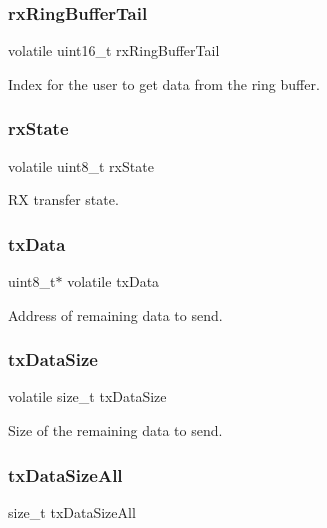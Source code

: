 \subsubsection{\texorpdfstring{rxRingBufferTail}{rxRingBufferTail}}
{\footnotesize\ttfamily volatile uint16\+\_\+t rx\+Ring\+Buffer\+Tail}

Index for the user to get data from the ring buffer. \mbox{\label{struct__lpuart__handle_a6f289c8f3bd5e967fb808de6da7f1c0c}} 
\subsubsection{\texorpdfstring{rxState}{rxState}}
{\footnotesize\ttfamily volatile uint8\+\_\+t rx\+State}

RX transfer state. \mbox{\label{struct__lpuart__handle_ab56d8f300582ce9d7f4a79729124739d}} 
\subsubsection{\texorpdfstring{txData}{txData}}
{\footnotesize\ttfamily uint8\+\_\+t$\ast$ volatile tx\+Data}

Address of remaining data to send. \mbox{\label{struct__lpuart__handle_a1f9d0ac47a5cdabb34988d5d811aceaf}} 
\subsubsection{\texorpdfstring{txDataSize}{txDataSize}}
{\footnotesize\ttfamily volatile size\+\_\+t tx\+Data\+Size}

Size of the remaining data to send. \mbox{\label{struct__lpuart__handle_a733be3042be24bb3eb6f0c6a82d28862}} 
\subsubsection{\texorpdfstring{txDataSizeAll}{txDataSizeAll}}
{\footnotesize\ttfamily size\+\_\+t tx\+Data\+Size\+All}

